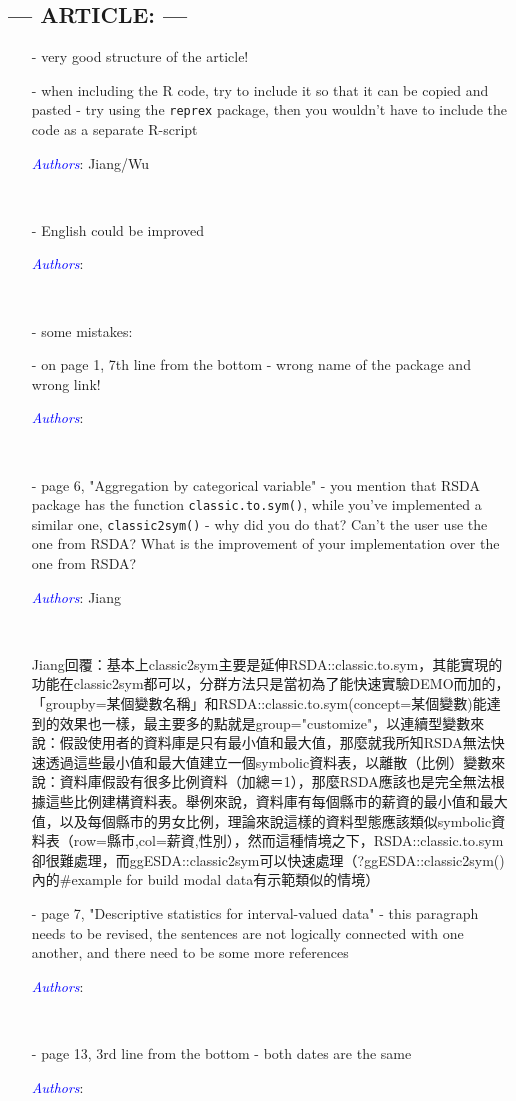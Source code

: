 \documentclass[11pt]{article}
\newcommand{\authors}[1]{

 \parbox{15cm}{\textcolor{blue}{\it Authors}: \color{red}#1}
 \\ \vspace{0.3cm}
}
\begin{document}
\subsection*{--- ARTICLE: ---}
\begin{itemize}
\item[-] very good structure of the article!

\item[-] when including the R code, try to include it so that it can be copied and pasted - try using the {\tt reprex} package, then you wouldn't have to include the code as a separate R-script
\authors{Jiang/Wu}


\item[-] English could be improved
\authors{}

\item[-] some mistakes:
\item[-] on page 1, 7th line from the bottom - wrong name of the package and wrong link!
\authors{}

\item[-] page 6, "Aggregation by categorical variable" - you mention that RSDA package has the function {\tt classic.to.sym()}, while you've implemented a similar one, {\tt classic2sym()} - why did you do that? Can't the user use the one from RSDA? What is the improvement of your implementation over the one from RSDA?
\authors{Jiang}
Jiang回覆：基本上classic2sym主要是延伸RSDA::classic.to.sym，其能實現的功能在classic2sym都可以，分群方法只是當初為了能快速實驗DEMO而加的，「groupby=某個變數名稱」和RSDA::classic.to.sym(concept=某個變數)能達到的效果也一樣，最主要多的點就是group="customize"，以連續型變數來說：假設使用者的資料庫是只有最小值和最大值，那麼就我所知RSDA無法快速透過這些最小值和最大值建立一個symbolic資料表，以離散（比例）變數來說：資料庫假設有很多比例資料（加總＝1），那麼RSDA應該也是完全無法根據這些比例建構資料表。舉例來說，資料庫有每個縣市的薪資的最小值和最大值，以及每個縣市的男女比例，理論來說這樣的資料型態應該類似symbolic資料表（row=縣市,col=薪資,性別），然而這種情境之下，RSDA::classic.to.sym卻很難處理，而ggESDA::classic2sym可以快速處理（?ggESDA::classic2sym()內的#example for build modal data有示範類似的情境）


\item[-] page 7, "Descriptive statistics for interval-valued data" - this paragraph needs to be revised, the sentences are not logically connected with one another, and there need to be some more references
\authors{}


\item[-] page 13, 3rd line from the bottom - both dates are the same
\authors{}



\end{itemize}
\end{document}
